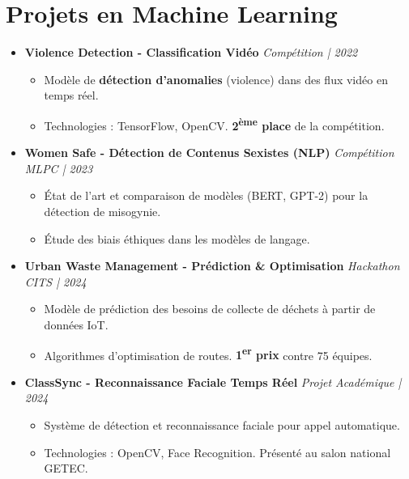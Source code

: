 \documentclass[a4paper,11pt]{article}
\begin{document}
\section{Projets en Machine Learning}
\begin{itemize}[leftmargin=*, label={-}]

\item \textbf{Violence Detection - Classification Vidéo} \hfill \textit{Compétition | 2022}
\vspace{-2pt}
\begin{itemize}[leftmargin=0.4cm, nosep, label=\tiny$\bullet$]
    \item \small{Modèle de \textbf{détection d'anomalies} (violence) dans des flux vidéo en temps réel.}
    \item \small{Technologies : TensorFlow, OpenCV. \textbf{2\textsuperscript{ème} place} de la compétition.}
\end{itemize}
\vspace{3pt}

\item \textbf{Women Safe - Détection de Contenus Sexistes (NLP)} \hfill \textit{Compétition MLPC | 2023}
\vspace{-2pt}
\begin{itemize}[leftmargin=0.4cm, nosep, label=\tiny$\bullet$]
    \item \small{État de l'art et comparaison de modèles (BERT, GPT-2) pour la détection de misogynie.}
    \item \small{Étude des biais éthiques dans les modèles de langage.}
\end{itemize}
\vspace{3pt}

\item \textbf{Urban Waste Management - Prédiction \& Optimisation} \hfill \textit{Hackathon CITS | 2024}
\vspace{-2pt}
\begin{itemize}[leftmargin=0.4cm, nosep, label=\tiny$\bullet$]
    \item \small{Modèle de prédiction des besoins de collecte de déchets à partir de données IoT.}
    \item \small{Algorithmes d'optimisation de routes. \textbf{1\textsuperscript{er} prix} contre 75 équipes.}
\end{itemize}
\vspace{3pt}

\item \textbf{ClassSync - Reconnaissance Faciale Temps Réel} \hfill \textit{Projet Académique | 2024}
\vspace{-2pt}
\begin{itemize}[leftmargin=0.4cm, nosep, label=\tiny$\bullet$]
    \item \small{Système de détection et reconnaissance faciale pour appel automatique.}
    \item \small{Technologies : OpenCV, Face Recognition. Présenté au salon national GETEC.}
\end{itemize}

\end{itemize}
\end{document}
